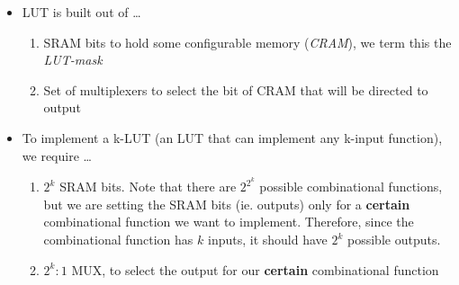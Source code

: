\documentclass{article}
\begin{document}
\begin{itemize}
    \item LUT is built out of \dots
        \begin{enumerate}
            \item SRAM bits to hold some configurable memory (\textit{CRAM}), we term this the \textit{LUT-mask}
            \item Set of multiplexers to select the bit of CRAM that will be directed to output
        \end{enumerate}
    \item To implement a k-LUT (an LUT that can implement any k-input function), we require \dots
        \begin{enumerate}
            \item $2^{k}$ SRAM bits. Note that there are $2^{2^{k}}$ possible combinational functions, but we are setting the SRAM bits (ie. outputs) only for a \textbf{certain} combinational function we want to implement.
                    Therefore, since the combinational function has $k$ inputs, it should have $2^{k}$ possible outputs.
            \item $2^{k}:1$ MUX, to select the output for our \textbf{certain} combinational function
        \end{enumerate}
\end{itemize}
\end{document}
